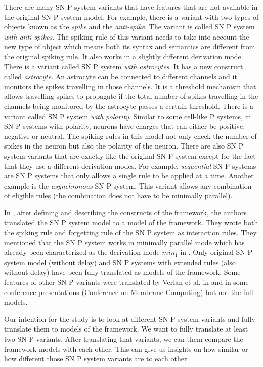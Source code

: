 \documentclass[12pt,A4]{article}
\begin{document}
There are many SN P system variants that have features that are not available in the original SN P
system model. For example, there is a variant with two types of objects known as the \emph{spike}
and the \emph{anti-spike}. The variant is called SN P system \emph{with anti-spikes}. The spiking
rule of this variant needs to take into account the new type of object which means both its syntax
and semantics are different from the original spiking rule. It also works in a slightly different 
derivation mode. There is a variant called SN P system \emph{with astrocytes}. It has a new 
construct called \emph{astrocyte}. An astrocyte can be connected to different channels and it
monitors the spikes travelling in those channels. It is a threshold mechanism that allows 
travelling spikes to propagate if the total number of spikes travelling in the channels being 
monitored by the astrocyte passes a certain threshold. There is a variant called SN P system
\emph{with polarity}. Similar to some cell-like P systems, in SN P systems with polarity, neurons
have charges that can either be positive, negative or neutral. The spiking rules in this model not
only check the number of spikes in the neuron but also the polarity of the neuron. There are also
SN P system variants that are exactly like the original SN P system except for the fact that they
use a different derivation modes. For example, \emph{sequential} SN P systems are SN P systems that
only allows a single rule to be applied at a time. Another example is the \emph{asynchronous} SN P
system. This variant allows any combination of eligible rules (the combination does not have to be
minimally parallel).

In \cite{verlan-2020-ff-snp}, after defining and describing the constructs of the framework, the
authors translated the SN P system model to a model of the framework. They wrote both the spiking
rule and forgetting rule of the SN P system as interaction rules. They mentioned that the SN P
system works in minimally parallel mode which has already been characterized as the derivation mode
$min_1$ in \cite{freund-2007-ff-stat}. Only original SN P system model (without delay) and SN P 
systems with extended rules (also without delay) have been fully translated as models of the 
framework. Some features of other SN P variants were translated by Verlan et al. in 
\cite{verlan-2020-ff-snp} and in some conference presentations (Conference on Membrane Computing)
but not the full models.

Our intention for the study is to look at different SN P system variants and fully translate them
to models of the framework. We want to fully translate at least two SN P variants. After translating
that variants, we can them compare the framework models with each other. This can give us insights
on how similar or how different those SN P system variants are to each other.





\end{document}
